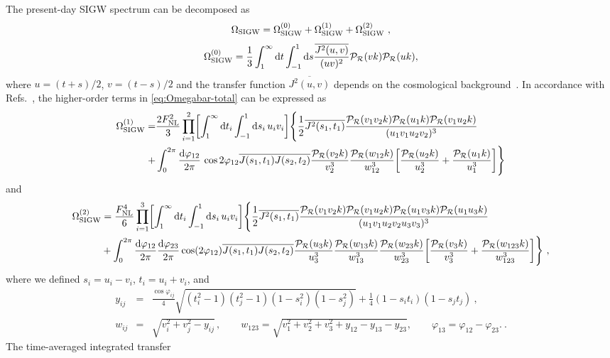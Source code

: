 \documentclass[twocolumn,superscriptaddress,aps,preprintnumbers,amsmath,amssymb,prl,footinbib]{revtex4-2}
\newcommand{\td}{{\rm d}}
\begin{document}
The present-day SIGW spectrum can be decomposed as~\cite{Inomata:2019yww,DeLuca:2019ufz,Yuan:2019fwv,Domenech:2020xin} \begin{equation}\label{eq:Omegabar-total} \Omega_{\rm SIGW} =\Omega_{\rm SIGW}^{(0)} +\Omega_{\rm SIGW}^{(1)} +\Omega_{\rm SIGW} ^{(2)} \ , \end{equation} \begin{align} \Omega_{\rm SIGW}^{(0)} = \frac{1}{3} \int_1^\infty \td t \int_{-1}^1 \td s \frac{\overline{J^2(u,v)}}{(u v)^2} {\cal P}_\mathcal{R} (v k) {\cal P}_\mathcal{R} (u k) , \label{eq:P_h_ts} \end{align} where $u=(t + s)/2$, $v=(t - s)/2$ and the transfer function $\overline{J^2 (u,v)}$ depends on the cosmological background~\cite{Kohri:2018awv,Espinosa:2018eve}. In accordance with Refs.~\cite{Adshead:2021hnm, Li:2023qua, Zhu:2023faa, Ragavendra:2021qdu, Atal:2021jyo}, the higher-order terms in \eqref{eq:Omegabar-total} can be expressed as \begin{align} \Omega_{\rm SIGW}^{(1)} =& \frac{2F_{\rm NL}^2}{3} \prod_{i=1}^2 \biggl[\int_1^\infty \td t_i \int_{-1}^1 \td s_i\, u_iv_i\biggr] \Bigg\{ \frac{1}{2} \overline{J^2 (s_1,t_1)} \frac{ {\cal P}_\mathcal{R} (v_1 v_2 k) {\cal P}_\mathcal{R} (u_1 k) {\cal P}_\mathcal{R} (v_1 u_2 k)}{(u_1v_1u_2v_2)^3} \nonumber \\ +& \int_0^{2\pi} \frac{\td \varphi_{12}}{2\pi}\, \cos 2\varphi_{12} \overline{J (s_1,t_1) J (s_2,t_2)} \frac{{\cal P}_\mathcal{R} (v_2 k)}{v_2^3} \frac{{\cal P}_\mathcal{R} (w_{12} k)}{w_{12}^3} \bigg[ \frac{{\cal P}_\mathcal{R} (u_2 k)}{u_2^3} + \frac{{\cal P}_\mathcal{R} (u_1 k)}{u_1^3} \bigg] \Bigg\} \label{eq:Omega-C} \end{align} and \begin{align} \label{eq:Omega-N} \Omega_{\rm SIGW}^{(2)} &= \frac{F_{\rm NL}^4}{6} \prod_{i=1}^3 \biggl[\int_1^\infty \td t_i \int_{-1}^1 \td s_i\, u_iv_i\biggr] \Bigg\{\frac{1}{2}\overline{J^2 (s_1,t_1)} \frac{{\cal P}_\mathcal{R} (v_1 v_2 k) {\cal P}_\mathcal{R} (v_1 u_2 k) {\cal P}_\mathcal{R} (u_1 v_3 k) {\cal P}_\mathcal{R} (u_1 u_3 k)}{(u_1v_1u_2v_2u_3v_3)^3} \\ & + \int_0^{2\pi} \frac{\td \varphi_{12}}{2\pi}\frac{\td \varphi_{23}}{2\pi} \cos (2\varphi_{12} ) \overline{J (s_1,t_1) J (s_2,t_2)} \frac{{\cal P}_\mathcal{R}(u_3 k)}{u_3^3} \frac{{\cal P}_\mathcal{R} (w_{13} k)}{w_{13}^3} \frac{{\cal P}_\mathcal{R} (w_{23} k)}{w_{23}^3} \bigg[ \frac{{\cal P}_\mathcal{R} (v_3 k)}{v_3^3} + \frac{{\cal P}_\mathcal{R} (w_{123} k)}{w_{123}^3} \bigg]\Bigg\} \ , \nonumber \end{align} where we defined $s_i=u_i-v_i$, $t_i=u_i+v_i$, and \begin{subequations} \begin{eqnarray} y_{ij}&=&\frac{\cos\varphi_{ij}}{4}\sqrt{(t_i^2-1)(t_j^2-1)(1-s_i^2)(1-s_j^2)}+\frac{1}{4}(1-s_it_i)(1-s_jt_j)\ , \\ w_{ij}&=&\sqrt{v_i^2+v_j^2-y_{ij}}\, , \qquad w_{123}=\sqrt{v_1^2+v_2^2+v_3^2+y_{12}-y_{13}-y_{23}},\qquad \varphi_{13}=\varphi_{12}-\varphi_{23}.\ . \end{eqnarray} \end{subequations} The time-averaged integrated transfer 
\end{document}
